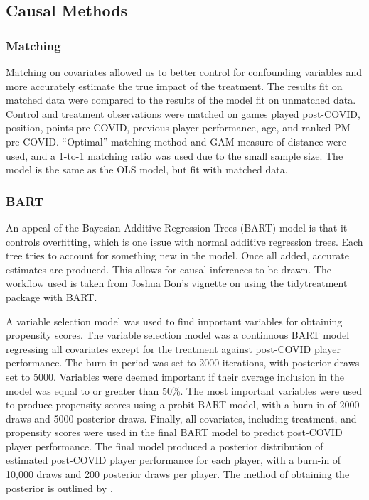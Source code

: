 \documentclass[12pt]{article}
\begin{document}
\hypertarget{causal-methods}{%
\subsection{Causal Methods}\label{causal-methods}}

\hypertarget{matching}{%
\subsubsection{Matching}\label{matching}}

Matching on covariates allowed us to better control for confounding
variables and more accurately estimate the true impact of the treatment.
The results fit on matched data were compared to the results of the
model fit on unmatched data. Control and treatment observations were
matched on games played post-COVID, position, points pre-COVID, previous
player performance, age, and ranked PM pre-COVID. ``Optimal'' matching
method and GAM measure of distance were used, and a 1-to-1 matching
ratio was used due to the small sample size. The model is the same as
the OLS model, but fit with matched data.

\hypertarget{bart}{%
\subsubsection{BART}\label{bart}}

An appeal of the Bayesian Additive Regression Trees (BART) model is that
it controls overfitting, which is one issue with normal additive
regression trees. Each tree tries to account for something new in the
model. Once all added, accurate estimates are produced. This allows for
causal inferences to be drawn. The workflow used is taken from Joshua
Bon's vignette on using the tidytreatment package with BART.

A variable selection model was used to find important variables for
obtaining propensity scores. The variable selection model was a
continuous BART model regressing all covariates except for the treatment
against post-COVID player performance. The burn-in period was set to
2000 iterations, with posterior draws set to 5000. Variables were deemed
important if their average inclusion in the model was equal to or
greater than 50\%. The most important variables were used to produce
propensity scores using a probit BART model, with a burn-in of 2000
draws and 5000 posterior draws. Finally, all covariates, including
treatment, and propensity scores were used in the final BART model to
predict post-COVID player performance. The final model produced a
posterior distribution of estimated post-COVID player performance for
each player, with a burn-in of 10,000 draws and 200 posterior draws per
player. The method of obtaining the posterior is outlined by
\citet{chipman}.
\end{document}
